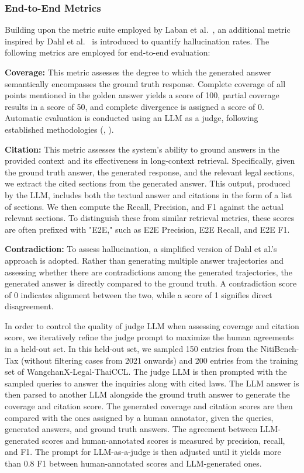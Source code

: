 \subsubsection{End-to-End Metrics}
\label{subsubsec: e2e_metric}

Building upon the metric suite employed by Laban et al.~\cite{laban2024summaryhaystackchallengelongcontext}, an additional metric inspired by Dahl et al.~\cite{Dahl_2024} is introduced to quantify hallucination rates. The following metrics are employed for end-to-end evaluation:

\textbf{Coverage:} This metric assesses the degree to which the generated answer semantically encompasses the ground truth response. 
%
Complete coverage of all points mentioned in the golden answer yields a score of 100, partial coverage results in a score of 50, and complete divergence is assigned a score of 0. 
%
Automatic evaluation is conducted using an LLM as a judge, following established methodologies (\cite{phan2024ragvslongcontext}, \cite{es2023ragasautomatedevaluationretrieval}).

\textbf{Citation: } This metric assesses the system's ability to ground answers in the provided context and its effectiveness in long-context retrieval. 
%
Specifically, given the ground truth answer, the generated response, and the relevant legal sections, we extract the cited sections from the generated answer.
%
This output, produced by the LLM, includes both the textual answer and citations in the form of a list of sections. 
%
We then compute the Recall, Precision, and F1 against the actual relevant sections. 
%
To distinguish these from similar retrieval metrics, these scores are often prefixed with "E2E," such as E2E Precision, E2E Recall, and E2E F1.

\textbf{Contradiction: } To assess hallucination, a simplified version of Dahl et al.'s \cite{Dahl_2024} approach is adopted. 
%
Rather than generating multiple answer trajectories and assessing whether there are contradictions among the generated trajectories, the generated answer is directly compared to the ground truth. 
%
A contradiction score of 0 indicates alignment between the two, while a score of 1 signifies direct disagreement.

In order to control the quality of judge LLM when assessing coverage and citation score, we iteratively refine the judge prompt to maximize the human agreements in a held-out set. 
%
In this held-out set, we sampled 150 entries from the NitiBench-Tax (without filtering cases from 2021 onwards) and 200 entries from the training set of WangchanX-Legal-ThaiCCL. 
%
The judge LLM is then prompted with the sampled queries to answer the inquiries along with cited laws. 
%
The LLM answer is then parsed to another LLM alongside the ground truth answer to generate the coverage and citation score. 
%
The generated coverage and citation scores are then compared with the ones assigned by a human annotator, given the queries, generated answers, and ground truth answers.
%
The agreement between LLM-generated scores and human-annotated scores is measured by precision, recall, and F1. 
%
The prompt for LLM-as-a-judge is then adjusted until it yields more than 0.8 F1 between human-annotated scores and LLM-generated ones.

